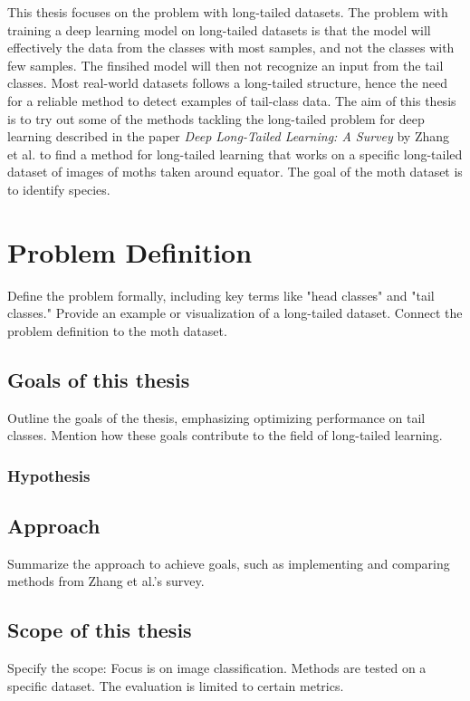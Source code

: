 

\label{sec:introduction}
This thesis focuses on the problem with long-tailed datasets. The problem with training a deep learning model on long-tailed datasets is that the model will effectively 
the data from the classes with most samples, and not the classes with few samples. The finsihed model will then not recognize an input from the tail classes. Most real-world
datasets follows a long-tailed structure, hence the need for a reliable method to detect examples of tail-class data. The aim of this thesis is to try out some of the methods tackling the long-tailed problem for deep learning described in the paper \textit{Deep Long-Tailed Learning: A Survey} by Zhang et al.\cite{zhang2023deep} to find a method for long-tailed learning that works on a specific long-tailed dataset of images of moths taken around equator. The goal of the moth dataset is to identify species.

\section{Problem Definition}
Define the problem formally, including key terms like "head classes" and "tail classes."
Provide an example or visualization of a long-tailed dataset.
Connect the problem definition to the moth dataset.

\subsection{Goals of this thesis}
Outline the goals of the thesis, emphasizing optimizing performance on tail classes.
Mention how these goals contribute to the field of long-tailed learning.

\subsubsection{Hypothesis}


\subsection{Approach}
Summarize the approach to achieve goals, such as implementing and comparing methods from Zhang et al.’s survey.

\subsection{Scope of this thesis}
Specify the scope:
Focus is on image classification.
Methods are tested on a specific dataset.
The evaluation is limited to certain metrics.

